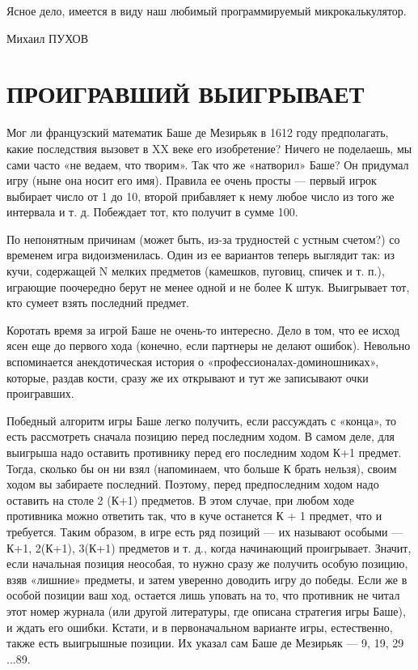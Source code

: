 \documentclass[11pt,a4paper,oneside]{article}
\begin{document}
Ясное дело, имеется в виду наш любимый программируемый микрокалькулятор.

Михаил ПУХОВ

\section{ПРОИГРАВШИЙ ВЫИГРЫВАЕТ}
Мог ли французский математик Баше де Мезирьяк в 1612 году предполагать, какие последствия вызовет в XX веке его изобретение? Ничего не поделаешь, мы сами часто «не ведаем, что творим». Так что же «натворил» Баше? Он придумал игру (ныне она носит его имя). Правила ее очень просты — первый игрок выбирает число от 1 до 10, второй прибавляет к нему любое число из того же интервала и т. д. Побеждает тот, кто получит в сумме 100.

По непонятным причинам (может быть, из-за трудностей с устным счетом?) со временем игра видоизменилась. Один из ее вариантов теперь выглядит так: из кучи, содержащей N мелких предметов (камешков, пуговиц, спичек и т. п.), играющие поочередно берут не менее одной и не более К штук. Выигрывает тот, кто сумеет взять последний предмет.

Коротать время за игрой Баше не очень-то интересно. Дело в том, что ее исход ясен еще до первого хода (конечно, если партнеры не делают ошибок). Невольно вспоминается анекдотическая история о «профессионалах-доминошниках», которые, раздав кости, сразу же их открывают и тут же записывают очки проигравших.

Победный алгоритм игры Баше легко получить, если рассуждать с «конца», то есть рассмотреть сначала позицию перед последним ходом. В самом деле, для выигрыша надо оставить противнику перед его последним ходом К+1 предмет. Тогда, сколько бы он ни взял (напоминаем, что больше К брать нельзя), своим ходом вы забираете последний. Поэтому, перед предпоследним ходом надо оставить на столе 2 (К+1) предметов. В этом случае, при любом ходе противника можно ответить так, что в куче останется К + 1 предмет, что и требуется. Таким образом, в игре есть ряд позиций — их называют особыми — К+1, 2(К+1), 3(К+1) предметов и т. д., когда начинающий проигрывает. Значит, если начальная позиция неособая, то нужно сразу же получить особую позицию, взяв «лишние» предметы, и затем уверенно доводить игру до победы. Если же в особой позиции ваш ход, остается лишь уповать на то, что противник не читал этот номер журнала (или другой литературы, где описана стратегия игры Баше), и ждать его ошибки. Кстати, и в первоначальном варианте игры, естественно, также есть выигрышные позиции. Их указал сам Баше де Мезирьяк — 9, 19, 29 ...89.
\end{document}
